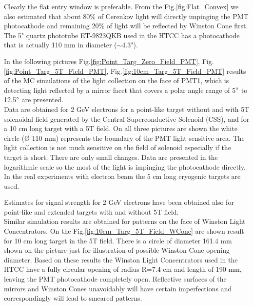 Clearly the flat entry window is preferable. From the Fig.\ref{fig:Flat_Convex} we also estimated that about 80\% of Cerenkov light will directly impinging the PMT photocathode and remaining 20\% of light will be reflected by Winston Cone first. The 5" quartz phototube ET-9823QKB used in the HTCC has a photocathode that is actually 110 mm in diameter ($\sim$4.3"). 

In the following pictures Fig.\ref{fig:Point_Targ_Zero_Field_PMT}, Fig.\ref{fig:Point_Targ_5T_Field_PMT}, Fig.\ref{fig:10cm_Targ_5T_Field_PMT} results of the MC simulations of the light collection on the face of PMT1, which is detecting light reflected by a mirror facet that covers a polar angle range of 5$\degree$ to 12.5$\degree$ are presented. \\
\indent Data are obtained for 2 GeV electrons for a point-like target without and with 5T solenoidal field generated by the Central Superconductive Solenoid (CSS), and for a 10 cm long target with a 5T field. On all three pictures are shown the white circle (Ø 110 mm) represents the boundary of the PMT light sensitive area. The light collection is not much sensitive on the field of solenoid especially if the target is short. There are only small changes. Data are presented in the logarithmic scale so the most of the light is impinging the photocathode directly. 
In the real experiments with electron beam the 5 cm long cryogenic targets are used. 

Estimates for signal strength for 2 GeV electrons have been obtained also for point-like and extended targets with and without 5T field. \\
\indent Similar simulation results are obtained for patterns on the face of Winston Light Concentrators. On the Fig.\ref{fig:10cm_Targ_5T_Field_WCone} are shown result for 10 cm long target in the 5T field. There is a circle of diameter 161.4 mm shown on the picture just for illustration of possible Winston Cone opening diameter. Based on these results the Winston Light Concentrators used in the HTCC have a fully circular opening of radius R=7.4 cm and length of 190 mm, leaving the PMT photocathode completely open. Reflective surfaces of the mirrors and Winston Cones unavoidably will have certain imperfections and correspondingly will lead to smeared patterns. 

